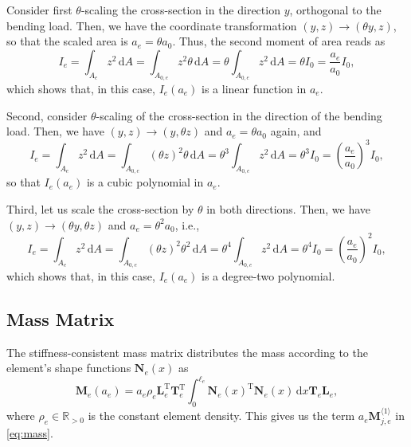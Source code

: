 \documentclass[final,onefignum,onetabnum]{siamart220329}
\begin{document}
{Consider first $\theta$-scaling the cross-section in the direction $y$, orthogonal to the bending load. Then, we have the coordinate transformation $(y,z)\rightarrow (\theta y, z)$, so that the scaled area is $a_e = \theta a_0$. Thus, the second moment of area reads as
$$
I_e = \int_{A_{e}} z^2 \,\mathrm{d}A = \int_{A_{0,e}} z^2 \theta \,\mathrm{d}A = \theta \int_{A_{0,e}} z^2 \,\mathrm{d}A = \theta I_0 = \frac{a_e}{a_0} I_0,
$$
%
which shows that, in this case, $I_e (a_e)$ is a linear function in $a_e$.

Second, consider $\theta$-scaling of the cross-section in the direction of the bending load. Then, we have $(y,z)\rightarrow (y, \theta z)$ and $a_e = \theta a_0$ again, and
%
$$
I_e = \int_{A_e} z^2  \,\mathrm{d}A = \int_{A_{0,e}} \left(\theta z\right)^2  \theta \,\mathrm{d}A = \theta^3 \int_{A_{0,e}} z^2 \,\mathrm{d}A = \theta^3 I_0 = \left( \frac{a_e}{a_0}\right)^3 I_0,
$$
so that $I_e (a_e)$ is a cubic polynomial in $a_e$.

Third, let us scale the cross-section by $\theta$ in both directions. Then, we have $(y,z)\rightarrow (\theta y, \theta z)$ and $a_e = \theta^2 a_0$, i.e.,
%
$$
I_e = \int_{A_e} z^2  \,\mathrm{d}A= \int_{A_{0,e}} \left(\theta z\right)^2  \theta^2 \,\mathrm{d}A = \theta^4 \int_{A_{0,e}} z^2 \,\mathrm{d}A = \theta^4 I_0 = \left(\frac{a_e}{a_0}\right)^2 I_0,
$$
%
which shows that, in this case, $I_e(a_e)$ is a degree-two polynomial.

\subsection{Mass Matrix}

The stiffness-consistent mass matrix distributes the mass according to the element's shape functions $\mathbf{N}_e(x)$ as
%
$$\mathbf{M}_e (a_e) = a_e \rho_e \mathbf{L}_e^\mathrm{T} \mathbf{T}_e^\mathrm{T} \int_{0}^{\ell_e} \mathbf{N}_e(x)^\mathrm{T}\mathbf{N}_e(x) \, \mathrm{d}x \mathbf{T}_e \mathbf{L}_e,$$
%
where $\rho_e \in \mathbb{R}_{>0}$ is the constant element density. This gives us the term $a_e\mathbf{M}_{j,e}^{\langle 1\rangle}$ in \eqref{eq:mass}.
}

\newpage


\end{document}
